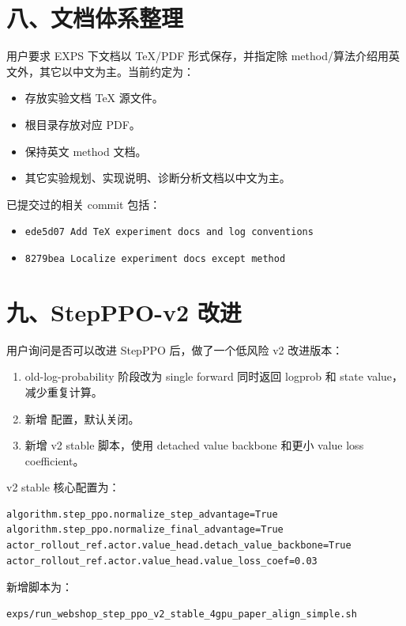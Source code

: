 \documentclass[10pt]{ctexart}
\begin{document}
\section*{八、文档体系整理}
用户要求 EXPS 下文档以 TeX/PDF 形式保存，并指定除 method/算法介绍用英文外，其它以中文为主。当前约定为：
\begin{itemize}
\item {} 存放实验文档 TeX 源文件。
\item {} 根目录存放对应 PDF。
\item {} 保持英文 method 文档。
\item 其它实验规划、实现说明、诊断分析文档以中文为主。
\end{itemize}

已提交过的相关 commit 包括：
\begin{itemize}
\item \texttt{ede5d07 Add TeX experiment docs and log conventions}
\item \texttt{8279bea Localize experiment docs except method}
\end{itemize}

\section*{九、StepPPO-v2 改进}
用户询问是否可以改进 StepPPO 后，做了一个低风险 v2 改进版本：
\begin{enumerate}
\item old-log-probability 阶段改为 single forward 同时返回 logprob 和 state value，减少重复计算。
\item 新增  配置，默认关闭。
\item 新增 v2 stable 脚本，使用 detached value backbone 和更小 value loss coefficient。
\end{enumerate}

v2 stable 核心配置为：
\begin{verbatim}
algorithm.step_ppo.normalize_step_advantage=True
algorithm.step_ppo.normalize_final_advantage=True
actor_rollout_ref.actor.value_head.detach_value_backbone=True
actor_rollout_ref.actor.value_head.value_loss_coef=0.03
\end{verbatim}

新增脚本为：
\begin{verbatim}
exps/run_webshop_step_ppo_v2_stable_4gpu_paper_align_simple.sh
\end{verbatim}
\end{document}
